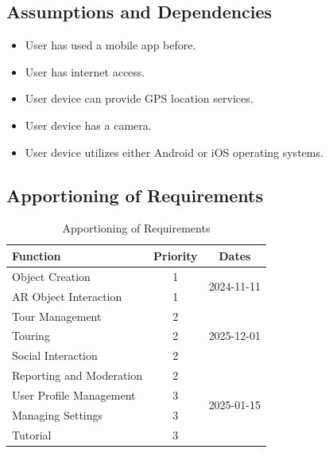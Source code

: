 \documentclass{article}
\begin{document}
\subsection{Assumptions and Dependencies}

\begin{itemize}
    \item User has used a mobile app before.
    \item User has internet access.
    \item User device can provide GPS location services.
    \item User device has a camera.
    \item User device utilizes either Android or iOS operating systems.
\end{itemize}
\subsection{Apportioning of Requirements}


\begin{table}[]
\caption{Apportioning of Requirements}
\label{tab:apportioning_table}
\centering
\begin{tabular}{lcc}
    \toprule
        \textbf{Function} & \textbf{Priority} & \textbf{Dates} \\
    \hline \hline
Object Creation          & 1 & \multirow{2}{*}{2024-11-11} \\
AR Object Interaction    & 1 &                             \\ \hline
Tour Management          & 2 & \multirow{3}{*}{2025-12-01} \\
Touring                  & 2 & \\
Social Interaction       & 2 &                             \\
Reporting and Moderation & 2 & \multirow{4}{*}{2025-01-15} \\ \hline
User Profile Management  & 3 &                             \\
Managing Settings        & 3 &                             \\
Tutorial                 & 3 &                             \\
    \hline
\end{tabular}
\end{table}
\end{document}
